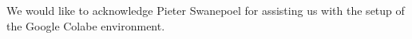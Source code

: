 \documentclass[conference]{IEEEtran}
\begin{document}
We would like to acknowledge Pieter Swanepoel for assisting us with the setup of the Google Colabe environment.





\end{document}

